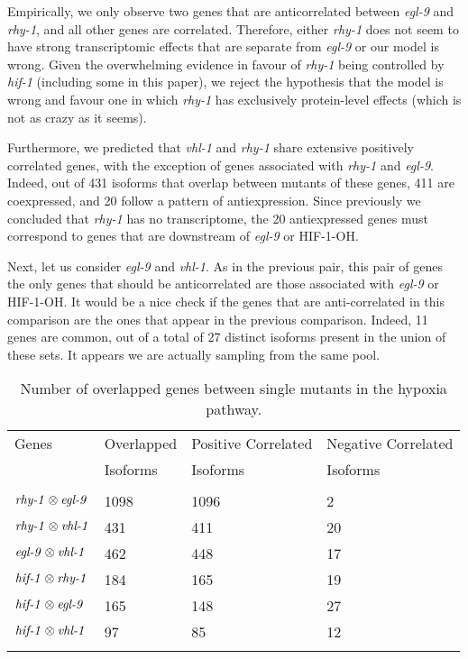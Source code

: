 \documentclass{article}
\newcommand{\ra}[1]{\renewcommand{\arraystretch}{#1}}
\newcommand{\gene}[1]{\textrm{\emph{#1}}}
\newcommand{\protein}[1]{\textrm{#1}}
\theoremstyle{definition}
\begin{document}
Empirically, we only observe two genes that are anticorrelated between \gene{egl-9} and \gene{rhy-1}, and all other genes are correlated. Therefore, either \gene{rhy-1} does not seem to have strong transcriptomic effects that are separate from \gene{egl-9} or our model is wrong. Given the overwhelming evidence in favour of \gene{rhy-1} being controlled by \gene{hif-1} (including some in this paper), we reject the hypothesis that the model is wrong and favour one in which \gene{rhy-1} has exclusively protein-level effects (which is not as crazy as it seems).

Furthermore, we predicted that \gene{vhl-1} and \gene{rhy-1} share extensive positively correlated genes, with the exception of genes associated with \gene{rhy-1} and \gene{egl-9}. Indeed, out of 431 isoforms that overlap between mutants of these genes, 411 are coexpressed, and 20 follow a pattern of antiexpression. Since previously we concluded that \gene{rhy-1} has no transcriptome, the 20 antiexpressed genes must correspond to genes that are downstream of \gene{egl-9} or \protein{HIF-1-OH}.

Next, let us consider \gene{egl-9} and \gene{vhl-1}. As in the previous pair, this pair of genes the only genes that should be anticorrelated are those associated with \gene{egl-9} or \protein{HIF-1-OH}. It would be a nice check if the genes that are anti-correlated in this comparison are the ones that appear in the previous comparison. Indeed, 11 genes are common, out of a total of 27 distinct isoforms present in the union of these sets. It appears we are actually sampling from the same pool.

\begin{table*}
\renewcommand{\familydefault}{\sfdefault}\normalfont{}
\centering{}
\ra{1.3}
 \begin{tabular}{@{}llll@{}}
 \toprule{}
 Genes & Overlapped & Positive Correlated & Negative Correlated \\
  & Isoforms &  Isoforms &  Isoforms\\
\toprule{}\\
 $\gene{rhy-1}\otimes\gene{egl-9}$& 1098 & 1096 & 2\\
 $\gene{rhy-1}\otimes\gene{vhl-1}$& 431 & 411 & 20\\
 $\gene{egl-9}\otimes\gene{vhl-1}$& 462 & 448 & 17\\
 $\gene{hif-1}\otimes\gene{rhy-1}$& 184 & 165 & 19\\
 $\gene{hif-1}\otimes\gene{egl-9}$& 165 & 148 & 27\\
 $\gene{hif-1}\otimes\gene{vhl-1}$& 97 & 85 & 12\\
 \bottomrule{}
 \end{tabular}
\caption{Number of overlapped genes between single mutants in the hypoxia pathway.}
\label{tab:overlap}
\end{table*}
\end{document}

